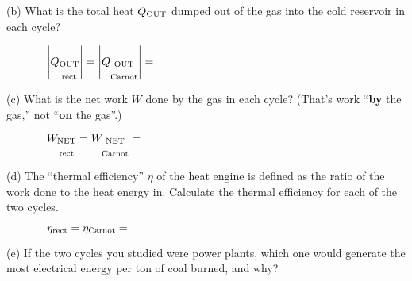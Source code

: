 (b) What is the total heat $Q_{\rm OUT}$ dumped out of the gas into the cold reservoir in each cycle?

\medskip
$\displaystyle
\hspace{0.5in} 
\left| Q_{\substack{\textrm{OUT} \\ \\ \textrm{rect}}} \right| = \hspace{\fill}
\left| Q_{\substack{\textrm{OUT} \\ \\ \textrm{Carnot}}} \right|= \hspace{\fill}
$
\answerspace{0.4in}

(c)  What is the net work $W$ done by the gas in each cycle?  (That's work ``\textbf{by} the gas,'' not ``\textbf{on} the gas''.) 

\medskip
$\displaystyle
\hspace{0.5in} 
W_{\substack{\textrm{NET} \\ \\ \textrm{rect}}} = \hspace{\fill}
W_{\substack{\textrm{NET} \\ \\ \textrm{Carnot}}} = \hspace{\fill}
$
\answerspace{0.4in}

(d)  The ``thermal efficiency'' $\eta$ of the heat engine is defined as the ratio of the work done to the heat energy in.  Calculate the thermal efficiency for each of the two cycles.

\medskip
$\displaystyle
\hspace{0.5in} 
\eta_{\rm rect} = \hspace{\fill}
\eta_{\rm Carnot} = \hspace{\fill}
$
\bigskip

(e) If the two cycles you studied were power plants, which one would generate the most electrical energy per ton of coal burned, and why?





